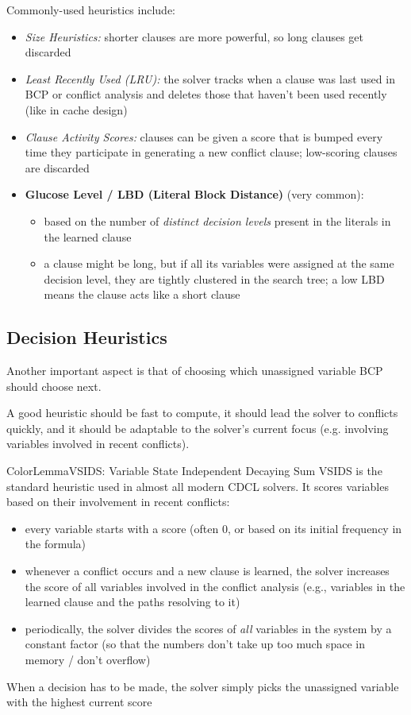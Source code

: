 \documentclass[a4paper, 11pt]{report}
\begin{document}
Commonly-used heuristics include:
\begin{itemize}
    \item \textit{Size Heuristics:} shorter clauses are more powerful, so long clauses get discarded
    \item \textit{Least Recently Used (LRU):} the solver tracks when a clause was last used in BCP or conflict analysis and deletes those that haven't been used recently (like in cache design)
    \item \textit{Clause Activity Scores:} clauses can be given a score that is bumped every time they participate in generating a new conflict clause; low-scoring clauses are discarded
    \item \textbf{Glucose Level / LBD (Literal Block Distance)} (very common):
    \begin{itemize}
        \item based on the number of \textit{distinct decision levels} present in the literals in the learned clause
        \item a clause might be long, but if all its variables were assigned at the same decision level, they are tightly clustered in the search tree; a low LBD means the clause acts like a short clause
    \end{itemize}
\end{itemize}

\subsection{Decision Heuristics}
Another important aspect is that of choosing which unassigned variable BCP should choose next.

A good heuristic should be fast to compute, it should lead the solver to conflicts quickly, and it should be adaptable to the solver's current focus (e.g. involving variables involved in recent conflicts).

\begin{cframe}{ColorLemma}{VSIDS: Variable State Independent Decaying Sum}
VSIDS is the standard heuristic used in almost all modern CDCL solvers. It scores variables based on their involvement in recent conflicts:
\begin{itemize}
    \item every variable starts with a score (often 0, or based on its initial frequency in the formula)
    \item whenever a conflict occurs and a new clause is learned, the solver increases the score of all variables involved in the conflict analysis (e.g., variables in the learned clause and the paths resolving to it)
    \item periodically, the solver divides the scores of \textit{all} variables in the system by a constant factor (so that the numbers don't take up too much space in memory / don't overflow)
\end{itemize}
When a decision has to be made, the solver simply picks the unassigned variable with the highest current score
\end{cframe}
\end{document}
